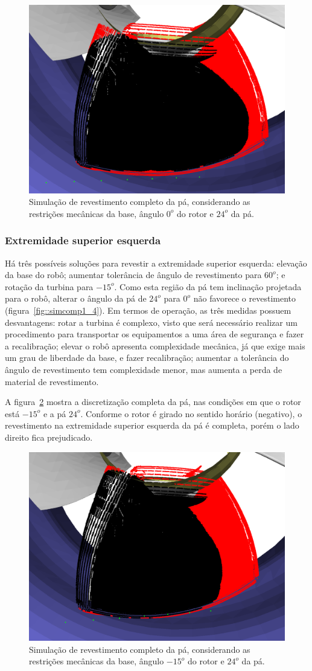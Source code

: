 \begin{figure}[!ht]
	\centering	
	\includegraphics[width=.5\columnwidth]{figs/simcomp1_1.png}
	\caption{Simulação de revestimento completo da pá, considerando as
	restrições mecânicas da base, ângulo $0^o$ do rotor e $24^o$ da pá.}
	\label{fig::simcomp1_1}
\end{figure}

\subsubsection{Extremidade superior esquerda}
Há três possíveis soluções para revestir a extremidade superior esquerda:
elevação da base do robô; aumentar tolerância de ângulo de revestimento para
$60^o$; e rotação da turbina para $-15^o$. Como esta
região da pá tem inclinação projetada para o robô, alterar o ângulo da pá de $24^o$ para $0^o$ não favorece o
revestimento (figura~\ref{fig::simcomp1_4}). Em termos de operação, as três
medidas possuem desvantagens: rotar a turbina é complexo, visto que será
necessário realizar um procedimento para transportar os equipamentos a uma área
de segurança e fazer a recalibração; elevar o robô apresenta complexidade
mecânica, já que exige mais um grau de liberdade da base, e fazer recalibração;
aumentar a tolerância do ângulo de revestimento tem complexidade menor, mas
aumenta a perda de material de revestimento.

A figura~\ref{fig::simcomp1_5} mostra a discretização completa da pá, nas
condições em que o rotor está $-15^o$ e a pá $24^o$. Conforme o rotor é
girado no sentido horário (negativo), o revestimento na extremidade superior
esquerda da pá é completa, porém o lado direito fica prejudicado.

\begin{figure}[!ht]
	\centering	
	\includegraphics[width=.5\columnwidth]{figs/simcomp1_5.png}
	\caption{Simulação de revestimento completo da pá, considerando as
	restrições mecânicas da base, ângulo $-15^o$ do rotor e $24^o$ da pá.}
	\label{fig::simcomp1_5}
\end{figure}

